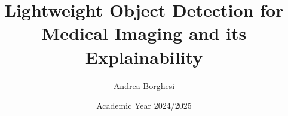 \documentclass[a4paper]{report}
\title{Lightweight Object Detection for Medical Imaging and its Explainability}
\author{Andrea Borghesi}
\date{Academic Year 2024/2025}
\begin{document}
\maketitlepage
\end{document}
